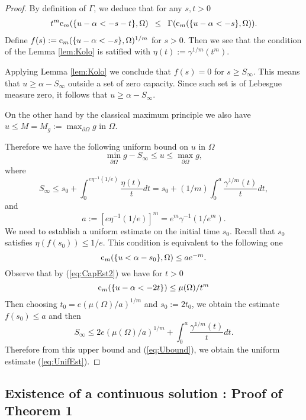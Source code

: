 \documentclass[12pt]{amsart}
\theoremstyle{definition}
\numberwithin{theorem}{section}
\numberwithin{equation}{section}
\begin{document}
{\begin{proof}
 By definition of $\Gamma$, we deduce that for any $s, t > 0$
\begin{eqnarray*}
t^m\hbox{c}_m  (\{u - \alpha <  - s - t\},\Omega)\, \, \, \leq  \, \, \, \Gamma  (\hbox{c}_m  (\{u - \alpha <  - s \},\Omega)). 
\end{eqnarray*}
 Define $f (s) :=\hbox{c}_m  (\{u - \alpha <  - s \},\Omega)^{1 \slash m}$ for $s > 0$. Then we see that the condition of the Lemma \ref{lem:Kolo} is satified with  $\eta (t) := \gamma^{1 \slash m} (t^m)$.

 Applying  Lemma \ref{lem:Kolo} we conclude that
 $ f (s) = 0 $ for $s \geq S_{\infty}$. This means that $u \geq  \alpha - S_{\infty}$ outside a set of zero capacity. Since such set is of Lebesgue measure zero, it follows that $u \geq  \alpha - S_{\infty}$.
 
 On the other hand by the classical maximum principle we also have $u \leq M = M_{g} := \max_{\partial \Omega} g$ in $\Omega$.
 
 Therefore we have the following uniform bound on $u$ in $\Omega$
 \begin{equation} \label{eq:Ubound}
  \min_{\partial \Omega} g - S_{\infty} \leq u \leq \max_{\partial \Omega} g,
 \end{equation}
  where
  $$
   S_{\infty} \leq  s_0 + \int_0^{e \eta^{-1} (1\slash e)}   \frac{\eta (t)}{t} d t  =    s_0 + (1 \slash m) \int_0^{a} \frac{\gamma^{1 \slash m} (t)}{t} d t,
 $$
 and
$$
 a :=  \left[e \eta^{-1} (1\slash e)\right]^m = e^m \gamma^{-1} (1\slash e^m).
 $$ 
 We need to establish a uniform estimate on the initial time $s_0$. 
 Recall that $s_0$ satisfies $\eta (f (s_0)) \leq 1 \slash e.$ This condition is equivalent to the following one   
 $$
\hbox{c}_m  (\{u <  \alpha   - s_0\},\Omega)  \leq a e^{- m}. 
 $$
 Observe that by (\ref{eq:CapEst2}) we have for $t > 0$
 $$
 \hbox{c}_m  (\{u -  \alpha <  - 2 t\})  \leq \mu (\Omega) \slash t^m
 $$
 Then choosing $t_0 =  e \left(\mu (\Omega)\slash a\right)^{1 \slash m}$ and  $s_0 := 2 t_0 $, we obtain the estimate  $f (s_0) \leq a$ and then 
 $$
 S_{\infty} \leq   2  e \left(\mu (\Omega)\slash a\right)^{1 \slash m}  + \int_0^{a} \frac{\gamma^{1 \slash m} (t)}{t} d t.
  $$
 Therefore from this upper bound and (\ref{eq:Ubound}),  we obtain the uniform estimate (\ref{eq:UnifEst}).
 \end{proof}

\subsection{Existence of a continuous solution : Proof of Theorem 1}

}
\end{document}
